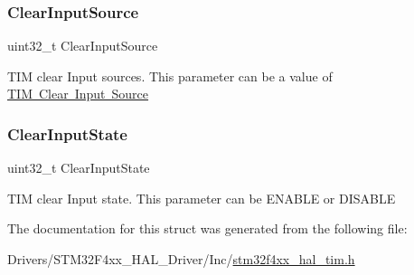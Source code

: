 \subsubsection{\texorpdfstring{Clear\+Input\+Source}{ClearInputSource}}
{\footnotesize\ttfamily uint32\+\_\+t Clear\+Input\+Source}

T\+IM clear Input sources. This parameter can be a value of \mbox{\hyperlink{group___t_i_m___clear_input___source}{T\+IM Clear Input Source}} \mbox{\label{struct_t_i_m___clear_input_config_type_def_ae375822fd9a07ebafaf13fc47db211db}} 
\subsubsection{\texorpdfstring{Clear\+Input\+State}{ClearInputState}}
{\footnotesize\ttfamily uint32\+\_\+t Clear\+Input\+State}

T\+IM clear Input state. This parameter can be E\+N\+A\+B\+LE or D\+I\+S\+A\+B\+LE 

The documentation for this struct was generated from the following file\+:\begin{DoxyCompactItemize}
\item 
Drivers/\+S\+T\+M32\+F4xx\+\_\+\+H\+A\+L\+\_\+\+Driver/\+Inc/\mbox{\hyperlink{stm32f4xx__hal__tim_8h}{stm32f4xx\+\_\+hal\+\_\+tim.\+h}}\end{DoxyCompactItemize}
